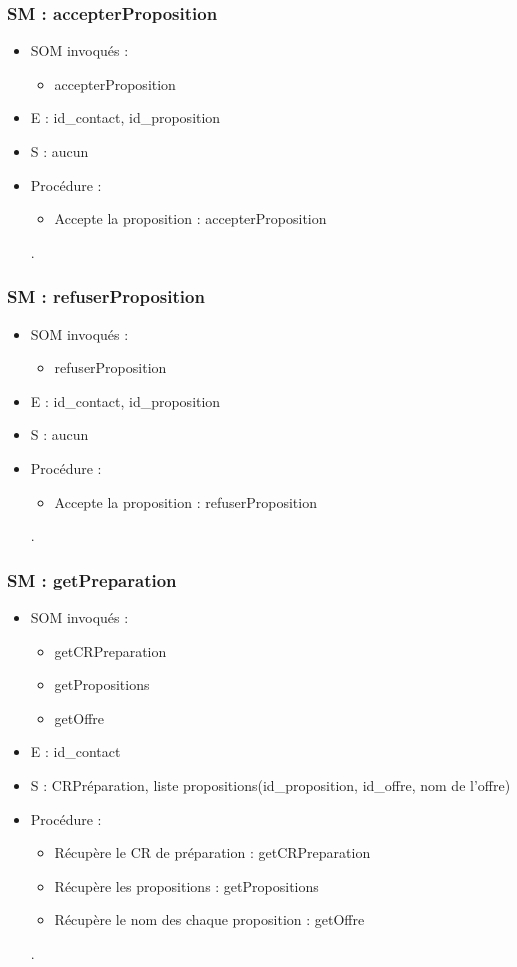 \subsubsection{SM : accepterProposition}
\begin{itemize}
	\item SOM invoqués :
	\begin{itemize}
		\item accepterProposition
	\end{itemize}
	\item E : id\_contact, id\_proposition
	\item S : aucun
	\item Procédure :
	\begin{itemize}
		\item Accepte la proposition : accepterProposition
	\end{itemize}.
\end{itemize}

\subsubsection{SM : refuserProposition}
\begin{itemize}
	\item SOM invoqués :
	\begin{itemize}
		\item refuserProposition
	\end{itemize}
	\item E : id\_contact, id\_proposition
	\item S : aucun
	\item Procédure :
	\begin{itemize}
		\item Accepte la proposition : refuserProposition
	\end{itemize}.
\end{itemize}

\subsubsection{SM : getPreparation}
\begin{itemize}
	\item SOM invoqués :
	\begin{itemize}
		\item getCRPreparation
		\item getPropositions
		\item getOffre
	\end{itemize}
	\item E : id\_contact
	\item S : CRPréparation, liste propositions(id\_proposition, id\_offre, nom de l’offre)
	\item Procédure :
	\begin{itemize}
		\item Récupère le CR de préparation : getCRPreparation
		\item Récupère les propositions : getPropositions
		\item Récupère le nom des chaque proposition : getOffre
	\end{itemize}.
\end{itemize}



